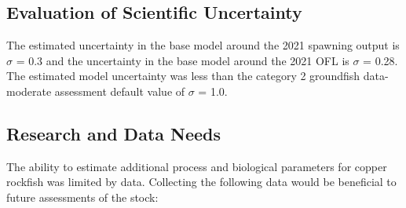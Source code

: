 \documentclass[11pt,
  english,
  a4paper,
]{article}
\begin{document}
\leavevmode\tagmcend\tagstructend\par


\hypertarget{evaluation-of-scientific-uncertainty}{%
\subsection{Evaluation of Scientific Uncertainty}\label{evaluation-of-scientific-uncertainty}}

\leavevmode\tagmcend\tagstructend


The estimated uncertainty in the base model around the 2021 spawning output is {\(\sigma\)\leavevmode\tagmcend\tagstructend} = 0.3 and the uncertainty in the base model around the 2021 OFL is {\(\sigma\)\leavevmode\tagmcend\tagstructend} = 0.28. The estimated model uncertainty was less than the category 2 groundfish data-moderate assessment default value of {\(\sigma\)\leavevmode\tagmcend\tagstructend} = 1.0.

\leavevmode\tagmcend\tagstructend\par


\hypertarget{research-and-data-needs}{%
\subsection{Research and Data Needs}\label{research-and-data-needs}}

\leavevmode\tagmcend\tagstructend


The ability to estimate additional process and biological parameters for copper rockfish was limited by data. Collecting the following data would be beneficial to future assessments of the stock:

\leavevmode\tagmcend\tagstructend\par
\end{document}
